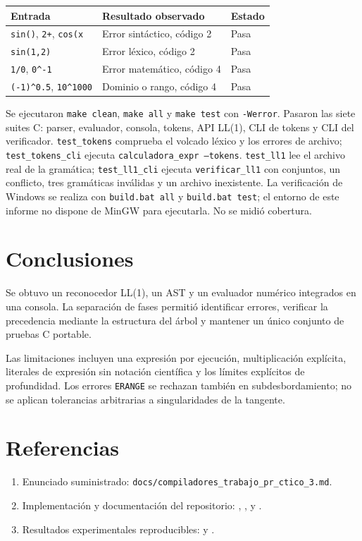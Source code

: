 \documentclass[11pt,a4paper]{article}
\begin{document}
\begin{center}\begin{tabular}{lll}\toprule
Entrada & Resultado observado & Estado \\\midrule
\texttt{sin()}, \texttt{2+}, \texttt{cos(x} & Error sintáctico, código 2 & Pasa \\
\texttt{sin(1,2)} & Error léxico, código 2 & Pasa \\
\texttt{1/0}, \verb|0^-1| & Error matemático, código 4 & Pasa \\
\verb|(-1)^0.5|, \verb|10^1000| & Dominio o rango, código 4 & Pasa \\\bottomrule\end{tabular}\end{center}
Se ejecutaron \texttt{make clean}, \texttt{make all} y \texttt{make test} con \texttt{-Werror}. Pasaron las siete suites C: parser, evaluador, consola, tokens, API LL(1), CLI de tokens y CLI del verificador. \texttt{test\_tokens} comprueba el volcado léxico y los errores de archivo; \texttt{test\_tokens\_cli} ejecuta \texttt{calculadora\_expr --tokens}. \texttt{test\_ll1} lee el archivo real de la gramática; \texttt{test\_ll1\_cli} ejecuta \texttt{verificar\_ll1} con conjuntos, un conflicto, tres gramáticas inválidas y un archivo inexistente. La verificación de Windows se realiza con \texttt{build.bat all} y \texttt{build.bat test}; el entorno de este informe no dispone de MinGW para ejecutarla. No se midió cobertura.
\section{Conclusiones}
Se obtuvo un reconocedor LL(1), un AST y un evaluador numérico integrados en una consola. La separación de fases permitió identificar errores, verificar la precedencia mediante la estructura del árbol y mantener un único conjunto de pruebas C portable.

Las limitaciones incluyen una expresión por ejecución, multiplicación explícita, literales de expresión sin notación científica y los límites explícitos de profundidad. Los errores \texttt{ERANGE} se rechazan también en subdesbordamiento; no se aplican tolerancias arbitrarias a singularidades de la tangente.
\section{Referencias}
\begin{enumerate}
\item Enunciado suministrado: \texttt{docs/compiladores\_trabajo\_pr\_ctico\_3.md}.
\item Implementación y documentación del repositorio: , ,  y .
\item Resultados experimentales reproducibles:  y .
\end{enumerate}
\end{document}

